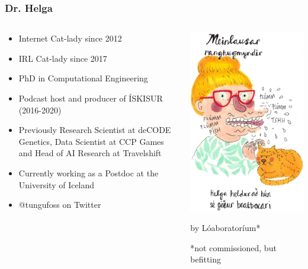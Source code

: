 \begin{frame}
    \frametitle{Dr. Helga}
    \begin{columns}[T]
        \begin{column}{0.55\textwidth}
            \begin{itemize}
                \item Internet Cat-lady since 2012
                \item IRL Cat-lady since 2017
                \item PhD in Computational Engineering
                \item Podcast host and producer of ÍSKISUR (2016-2020)
                \item Previously Research Scientist at deCODE Genetics, Data Scientist at CCP Games
                and Head of AI Research at Travelshift
                \item Currently working as a Postdoc at the University of Iceland
                \item @tungufoss on Twitter
            \end{itemize}
        \end{column}
        \begin{column}{0.4\textwidth}
            \centering
            \includegraphics[width=.8\textwidth]{../figures/helga}

            \footnotesize{by Lóaboratoríum*}

            \vspace{12pt}

            \scriptsize{*not commissioned, but befitting}
        \end{column}
    \end{columns}
\end{frame}


